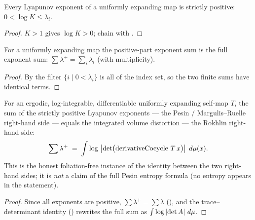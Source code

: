 \begin{corollary}\label{exponents_pos_of_expanding}
  \leanok
  Every Lyapunov exponent of a uniformly expanding map is strictly positive:
  \(0 < \log K \le \lambda_i\).
\end{corollary}
\begin{proof}\leanok
  \(K > 1\) gives \(\log K > 0\); chain with .
\end{proof}

\begin{proposition}\label{sumPosExp_eq_sumAllExp_of_expanding}
  \leanok
  For a uniformly expanding map the positive-part exponent sum is the full exponent sum:
  \(\sum\lambda^{+} = \sum_i\lambda_i\) (with multiplicity).
\end{proposition}
\begin{proof}\leanok
  By  the filter \(\{i \mid 0 < \lambda_i\}\) is all of the index
  set, so the two finite sums have identical terms.
\end{proof}

\begin{theorem}\label{sumPosExp_eq_integral_log_abs_det_of_expanding}
  \leanok
  For an ergodic, log-integrable, differentiable uniformly expanding self-map \(T\), the sum of
  the strictly positive Lyapunov exponents --- the Pesin / Margulis--Ruelle right-hand side ---
  equals the integrated volume distortion --- the Rokhlin right-hand side:
  \[
    \sum\lambda^{+} \;=\; \int \log\,\left\lvert \det\bigl(\operatorname{derivativeCocycle}\,T\,x\bigr) \right\rvert\;d\mu(x).
  \]
  This is the honest foliation-free instance of the identity between the two right-hand sides; it
  is \emph{not} a claim of the full Pesin entropy formula (no entropy appears in the statement).
\end{theorem}
\begin{proof}\leanok
  Since all exponents are positive, \(\sum\lambda^{+} = \sum\lambda\)
  (), and the trace--determinant identity
  () rewrites the full sum as
  \(\int\log\left\lvert \det A \right\rvert\,d\mu\).
\end{proof}

